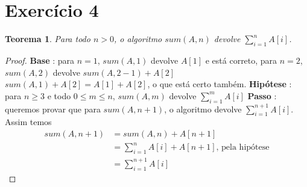 \documentclass{article}
\begin{document}
\section{Exercício 4}
\newtheorem{teo4}{Teorema}
\begin{teo4}
	Para todo $n > 0$, o algoritmo $sum(A,n)$ devolve $\sum\limits_{i=1}^{n}A[i]$.
\end{teo4}
\begin{proof}
	\hfill \break
	\textbf{Base} : para $n = 1$, $sum(A, 1)$ devolve $A[1]$ e está correto,\newline
	\hspace*{30pt} para $n = 2$, $sum(A, 2)$ devolve\newline
	\hspace*{30pt} $sum(A, 2-1) + A[2]$ \newline
	\hspace*{30pt} $sum(A, 1) + A[2] = A[1] + A[2]$, o que está certo também.\newline
	\newline
	\textbf{Hipótese} : para $n \geq 3$ e todo $0 \leq m \leq n$, $sum(A,m)$ devolve $\sum\limits_{i=1}^{m}A[i]$\newline
	\textbf{Passo} : queremos provar que para $sum(A,n+1)$, o algoritmo devolve $\sum\limits_{i=1}^{n+1}A[i]$.\newline	
	\hspace*{30pt} Assim temos
	\begin{equation}
		\begin{split}
		sum(A,n+1) & = sum(A,n) + A[n+1]\\
		& = \sum\limits_{i=1}^{n}A[i] + A[n+1]\text{, pela hipótese}\\
		& = \sum\limits_{i=1}^{n+1}A[i]
		\end{split}
	\end{equation}
\end{proof}
\end{document}
